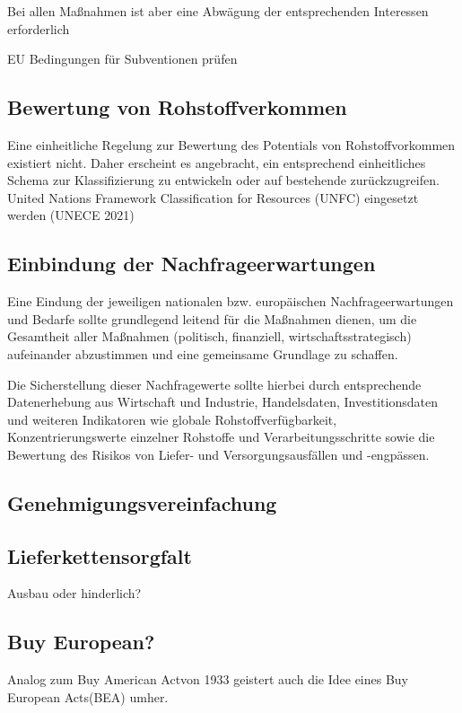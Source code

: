 \documentclass[12pt,a4paper,oneside]{book} %
\begin{document}
Bei allen Maßnahmen ist aber eine Abwägung der entsprechenden Interessen erforderlich

EU Bedingungen für Subventionen prüfen

\subsection{Bewertung von Rohstoffverkommen}
Eine einheitliche Regelung zur Bewertung des Potentials von Rohstoffvorkommen existiert nicht. Daher erscheint es angebracht, ein entsprechend einheitliches Schema zur Klassifizierung zu entwickeln oder auf bestehende zurückzugreifen.
United Nations Framework Classification for Resources (UNFC) eingesetzt werden (UNECE 2021)

\subsection{Einbindung der Nachfrageerwartungen}
Eine Eindung der jeweiligen nationalen bzw. europäischen Nachfrageerwartungen und Bedarfe sollte grundlegend leitend für die Maßnahmen dienen, um die Gesamtheit aller Maßnahmen (politisch, finanziell, wirtschaftsstrategisch) aufeinander abzustimmen und eine gemeinsame Grundlage zu schaffen.

Die Sicherstellung dieser Nachfragewerte sollte hierbei durch entsprechende Datenerhebung aus Wirtschaft und Industrie, Handelsdaten, Investitionsdaten und weiteren Indikatoren wie globale Rohstoffverfügbarkeit, Konzentrierungswerte einzelner Rohstoffe und Verarbeitungsschritte sowie die Bewertung des Risikos von Liefer- und Versorgungsausfällen und -engpässen.

\subsection{Genehmigungsvereinfachung}


\subsection{Lieferkettensorgfalt}
Ausbau oder hinderlich?


\subsection{Buy European?}

Analog zum \glqq Buy American Act\grqq von 1933 geistert auch die Idee eines \glqq Buy European Acts\grqq (BEA) umher.
\end{document}
